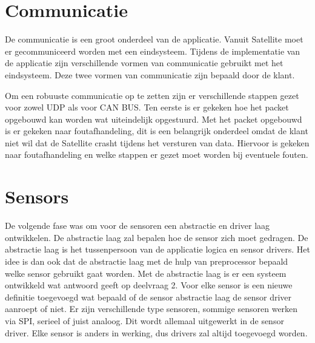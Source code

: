 \section{Communicatie}
De communicatie is een groot onderdeel van de applicatie. Vanuit Satellite moet er gecommuniceerd worden met een eindsysteem. Tijdens de implementatie van de applicatie zijn verschillende vormen van communicatie gebruikt met het eindsysteem. Deze twee vormen van communicatie zijn bepaald door de klant. \newline

Om een robuuste communicatie op te zetten zijn er verschillende stappen gezet voor zowel UDP als voor CAN BUS. Ten eerste is er gekeken hoe het packet opgebouwd kan worden wat uiteindelijk opgestuurd. Met het packet opgebouwd is er gekeken naar foutafhandeling, dit is een belangrijk onderdeel omdat de klant niet wil dat de Satellite crasht tijdens het versturen van data. Hiervoor is gekeken naar foutafhandeling en welke stappen er gezet moet worden bij eventuele fouten.


\section{Sensors}
De volgende fase was om voor de sensoren een abstractie en driver laag ontwikkelen. De abstractie laag zal bepalen hoe de sensor zich moet gedragen. De abstractie laag is het tussenpersoon van de applicatie logica en sensor drivers. Het idee is dan ook dat de abstractie laag met de hulp van preprocessor bepaald welke sensor gebruikt gaat worden. Met de abstractie laag is er een systeem ontwikkeld wat antwoord geeft op deelvraag 2. Voor elke sensor is een nieuwe definitie toegevoegd wat bepaald of de sensor abstractie laag de sensor driver aanroept of niet. Er zijn verschillende type sensoren, sommige sensoren werken via SPI, serieel of juist analoog. Dit wordt allemaal uitgewerkt in de sensor driver. Elke sensor is anders in werking, dus drivers zal altijd toegevoegd worden.

